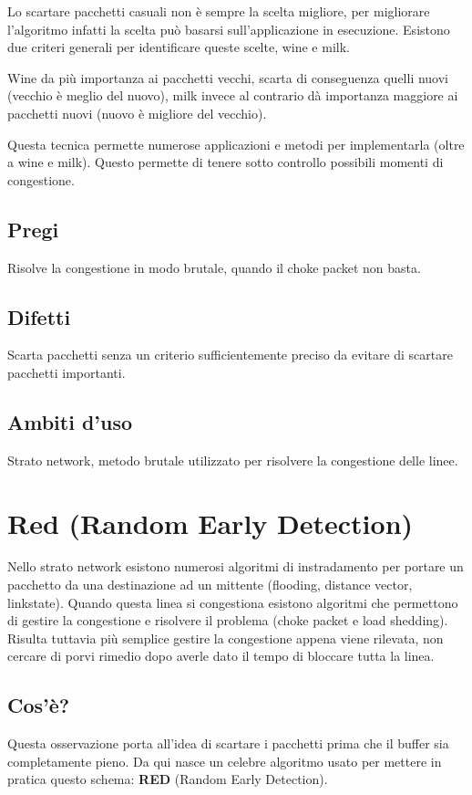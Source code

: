 Lo scartare pacchetti casuali non è sempre la scelta migliore, per migliorare l'algoritmo infatti la scelta può basarsi sull'applicazione in esecuzione. Esistono due criteri generali per identificare queste scelte, wine e milk.

Wine da più importanza ai pacchetti vecchi, scarta di conseguenza quelli nuovi (vecchio è meglio del nuovo), milk invece al contrario dà importanza maggiore ai pacchetti nuovi (nuovo è migliore del vecchio).

Questa tecnica permette numerose applicazioni e metodi per implementarla (oltre a wine e milk). Questo permette di tenere sotto controllo possibili momenti di congestione.

\subsection{Pregi}
Risolve la congestione in modo brutale, quando il choke packet non basta.

\subsection{Difetti}
Scarta pacchetti senza un criterio sufficientemente preciso da evitare di scartare pacchetti importanti.

\subsection{Ambiti d'uso}
Strato network, metodo brutale utilizzato per risolvere la congestione delle linee.

\section{Red (Random Early Detection)}

Nello strato network esistono numerosi algoritmi di instradamento per portare un pacchetto da una destinazione ad un mittente (flooding, distance vector, linkstate). Quando questa linea si congestiona esistono algoritmi che permettono di gestire la congestione e risolvere il problema (choke packet e load shedding). Risulta tuttavia più semplice gestire la congestione appena viene rilevata, non cercare di porvi rimedio dopo averle dato il tempo di bloccare tutta la linea.
\subsection{Cos'è?}
Questa osservazione porta all'idea di scartare i pacchetti prima che il buffer sia completamente pieno. Da qui nasce un celebre algoritmo usato per mettere in pratica questo schema: \textbf{RED} (Random Early Detection).


